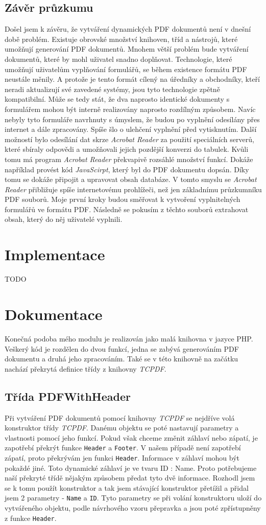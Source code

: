 \documentclass[czech,BP]{thesiskiv}
\begin{document}
\section{Závěr průzkumu}
Došel jsem k závěru, že vytváření dynamických PDF dokumentů není v dnešní době problém. Existuje obrovské množství knihoven, tříd a nástrojů, které umožňují generování PDF dokumentů. Mnohem větší problém bude vytváření dokumentů, které by mohl uživatel snadno doplňovat. Technologie, které umožňují uživatelům vyplňování formulářů, se během existence formátu PDF neustále měnily. A protože je tento formát cílený na úředníky a obchodníky, kteří neradi aktualizují své zavedené systémy, jsou tyto technologie zpětně kompatibilní. Může se tedy stát, že dva naprosto identické dokumenty s formulářem mohou být interně realizovány naprosto rozdílným způsobem. Navíc nebyly tyto formuláře navrhnuty s úmyslem, že budou po vyplnění odesílány přes internet a dále zpracovány. Spíše šlo o ulehčení vyplnění před vytisknutím. Další možností bylo odesílání dat skrze \emph{Acrobat Reader} za použití speciálních serverů, které sbíraly odpovědi a umožňovali jejich pozdější konverzi do tabulek. Kvůli tomu má program \emph{Acrobat Reader} překvapivě rozsáhlé množství funkcí. Dokáže například provést kód \emph{JavaScirpt}, který byl do PDF dokumentu dopsán. Díky tomu se dokáže připojit a upravovat obsah databáze. V tomto smyslu se \emph{Acrobat Reader} přibližuje spíše internetovému prohlížeči, než jen základnímu průzkumníku PDF souborů. Moje první kroky budou směřovat k vytvoření vyplnitelných formulářů ve formátu PDF. Následně se pokusím z těchto souborů extrahovat obsah, který do něj uživatelé vyplnili. 
\chapter{Implementace}
TODO
\chapter{Dokumentace}
Konečná podoba mého modulu je realizován jako malá knihovna v jazyce PHP. Veškerý kód je rozdělen do dvou funkcí, jedna se zabývá generováním PDF dokumentu a druhá jeho zpracováním. Také se v této knihovně na začátku nachází překrytá definice třídy z knihovny \emph{TCPDF}. 
\section{Třída PDFWithHeader}
Při vytváření PDF dokumentů pomocí knihovny \emph{TCPDF} se nejdříve volá konstruktor třídy \emph{TCPDF}. Danému objektu se poté nastavují parametry a vlastnosti pomocí jeho funkcí. Pokud však chceme změnit záhlaví nebo zápatí, je zapotřebí překrýt funkce \texttt{Header} a \texttt{Footer}. V našem případě není zapotřebí zápatí, proto překrývám jen funkci \texttt{Header}. Informace v záhlaví mohou být pokaždé jiné. Toto dynamické záhlaví je ve tvaru ID : Name. Proto potřebujeme naší překryté třídě nějakým způsobem předat tyto dvě informace. Rozhodl jsem se k tomu použít konstruktor a tak jsem stávající konstruktor přetížil a přidal jsem 2 parametry - \texttt{Name} a \texttt{ID}. Tyto parametry se při volání konstruktoru uloží do vytvářeného objektu, podle návrhového vzoru přepravka a jsou poté zpřístupněny z funkce \texttt{Header}.
\end{document}
